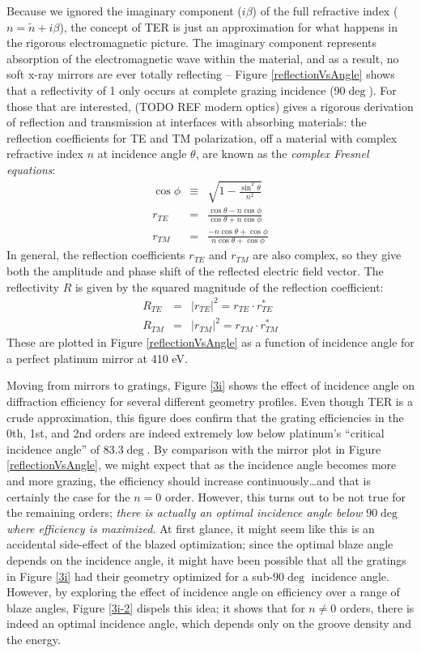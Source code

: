 Because we ignored the imaginary component ($i \beta$) of the full refractive index ($n = \tilde n + i \beta$), the concept of TER is just an approximation for what happens in the rigorous electromagnetic picture.  The imaginary component represents absorption of the electromagnetic wave within the material, and as a result, no soft x-ray mirrors are ever totally reflecting -- Figure \ref{reflectionVsAngle} shows that a reflectivity of 1 only occurs at complete grazing incidence (90$\deg$).  For those that are interested, (TODO REF modern optics) gives a rigorous derivation of reflection and transmission at interfaces with absorbing materials: the reflection coefficients for TE and TM polarization, off a material with complex refractive index $n$ at incidence angle $\theta$, are known as the \emph{complex Fresnel equations}:
\begin{eqnarray}
\cos \phi &\equiv& \sqrt{1 - \frac{\sin^2 \theta}{n^2} } \\
r_{TE} &=&     \frac{\cos \theta - n \cos \phi}     {\cos \theta + n \cos \phi} \\
r_{TM} &=&    \frac{-n \cos \theta + \cos \phi}              {n \cos \theta + \cos \phi}
\end{eqnarray}
In general, the reflection coefficients $r_{TE}$ and $r_{TM}$ are also complex, so they give both the amplitude and phase shift of the reflected electric field vector.  The reflectivity $R$ is given by the squared magnitude of the reflection coefficient:
\begin{eqnarray}
R_{TE} &=& | r_{TE} | ^2 =  r_{TE} \cdot r_{TE}^\ast \\
R_{TM} &=& | r_{TM} | ^2 = r_{TM} \cdot r_{TM}^\ast
\end{eqnarray}
These are plotted in Figure \ref{reflectionVsAngle} as a function of incidence angle for a perfect platinum mirror at 410 eV.

Moving from mirrors to gratings, Figure \ref{3i} shows the effect of incidence angle on diffraction efficiency for several different geometry profiles.  Even though TER is a crude approximation, this figure does confirm that the grating efficiencies in the 0th, 1st, and 2nd orders are indeed extremely low below platinum's ``critical incidence angle'' of 83.3$\deg$.    By comparison with the mirror plot in Figure \ref{reflectionVsAngle}, we might expect that as the incidence angle becomes more and more grazing, the efficiency should increase continuously\ldots and that is certainly the case for the $n=0$ order.  However, this turns out to be not true for the remaining orders; \emph{there is actually an optimal incidence angle below $90\deg$ where efficiency is maximized}.  At first glance, it might seem like this is an accidental side-effect of the blazed optimization; since the optimal blaze angle depends on the incidence angle, it might have been possible that all the gratings in Figure \ref{3i} had their geometry optimized for a sub-$90\deg$ incidence angle.  However, by exploring the effect of incidence angle on efficiency over a range of blaze angles, Figure \ref{3i-2} dispels this idea; it shows that for $n\neq 0$ orders, there is indeed an optimal incidence angle, which depends only on the groove density and the energy.

